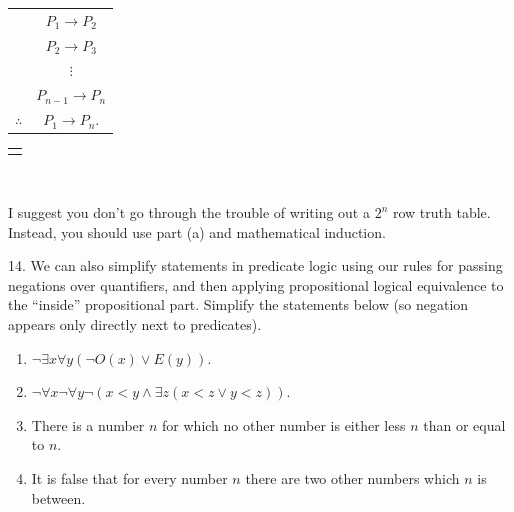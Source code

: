 \documentclass[10pt,]{book}
\theoremstyle{plain}
\theoremstyle{definition}
\theoremstyle{definition}
\theoremstyle{definition}
\numberwithin{equation}{chapter}
\newcommand{\hrulethin}  {\noalign{\hrule height 0.04em}}
\newlength{\panelmax}
\def\imp{\rightarrow}
\newcommand{\lt}{<}
\begin{document}
\begin{exerciselist}
\begin{enumerate}[label=(\alph*)]
{{{{\begin{tabular}{cc}
&\(P_1 \imp P_2\)\tabularnewline[0pt]
&\(P_2 \imp P_3\)\tabularnewline[0pt]
&\(\vdots\)\tabularnewline[0pt]
&\(P_{n-1} \imp P_n\)\tabularnewline\hrulethin
\(\therefore\)&\(P_1 \imp P_n\).
\end{tabular}
}}}
\ifdefined\phAtabular\else\newlength{\phAtabular}\fi%
\setlength{\phAtabular}{\ht\panelboxAtabular+\dp\panelboxAtabular}
\settototalheight{\phAtabular}{\usebox{\panelboxAtabular}}
\setlength{\panelmax}{\maxof{\panelmax}{\phAtabular}}
\leavevmode%
\setlength{\tabcolsep}{0\linewidth}
\par\medskip\noindent
\begin{tabular}{@{}*{1}{c}@{}}
\begin{minipage}[c][\panelmax][t]{1\linewidth}\usebox{\panelboxAtabular}\end{minipage}\end{tabular}\\
}%
\par
\hypertarget{p-2386}{}%
I suggest you don't go through the trouble of writing out a \(2^n\) row truth table. Instead, you should use part (a) and mathematical induction. %
\end{enumerate}
%
\par\smallskip
\item[14.]\hypertarget{exercise-112}{}\hypertarget{p-2387}{}%
We can also simplify statements in predicate logic using our rules for passing negations over quantifiers, and then applying propositional logical equivalence to the ``inside'' propositional part.  Simplify the statements below (so negation appears only directly next to predicates).%
\par
\hypertarget{p-2388}{}%
\leavevmode%
\begin{enumerate}[label=(\alph*)]
\item\hypertarget{li-498}{}\(\neg \exists x \forall y (\neg O(x) \vee E(y))\).%
\item\hypertarget{li-499}{}\(\neg \forall x \neg \forall y \neg(x \lt  y \wedge \exists z (x \lt  z \vee y \lt  z))\).%
\item\hypertarget{li-500}{}\hypertarget{p-2389}{}%
There is a number \(n\) for which no other number is either less \(n\) than or equal to \(n\).%
\item\hypertarget{li-501}{}\hypertarget{p-2390}{}%
It is false that for every number \(n\) there are two other numbers which \(n\) is between.%

\end{enumerate}
\end{exerciselist}
\end{document}
